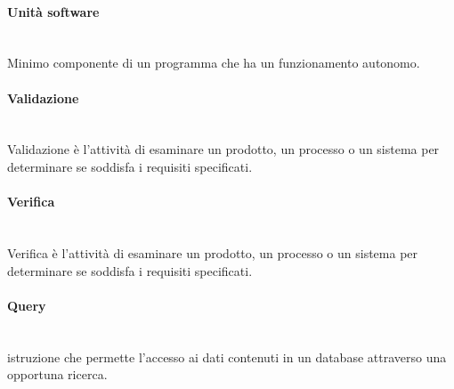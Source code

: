 \paragraph{Unità software}~\smallskip \\
Minimo componente di un programma che ha un funzionamento autonomo.

\paragraph{Validazione}~\smallskip \\
Validazione è l'attività di esaminare un prodotto, un processo o un sistema per determinare se soddisfa i requisiti specificati.

\paragraph{Verifica}~\smallskip \\
Verifica è l'attività di esaminare un prodotto, un processo o un sistema per determinare se soddisfa i requisiti specificati.

\paragraph{Query}~\smallskip \\
istruzione che permette l'accesso ai dati contenuti in un database attraverso una opportuna ricerca.


